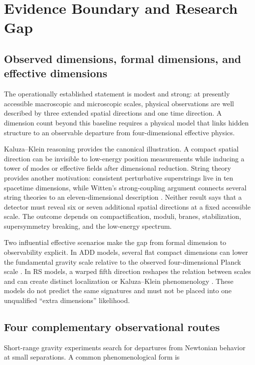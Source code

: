 \documentclass[conference]{IEEEtran}
\begin{document}
\section{Evidence Boundary and Research Gap}

\subsection{Observed dimensions, formal dimensions, and effective dimensions}

The operationally established statement is modest and strong: at presently accessible macroscopic and microscopic scales, physical observations are well described by three extended spatial directions and one time direction. A dimension count beyond this baseline requires a physical model that links hidden structure to an observable departure from four-dimensional effective physics.

Kaluza--Klein reasoning provides the canonical illustration. A compact spatial direction can be invisible to low-energy position measurements while inducing a tower of modes or effective fields after dimensional reduction. String theory provides another motivation: consistent perturbative superstrings live in ten spacetime dimensions, while Witten's strong-coupling argument connects several string theories to an eleven-dimensional description \cite{polchinski,witten}. Neither result says that a detector must reveal six or seven additional spatial directions at a fixed accessible scale. The outcome depends on compactification, moduli, branes, stabilization, supersymmetry breaking, and the low-energy spectrum.

Two influential effective scenarios make the gap from formal dimension to observability explicit. In ADD models, several flat compact dimensions can lower the fundamental gravity scale relative to the observed four-dimensional Planck scale \cite{add}. In RS models, a warped fifth direction reshapes the relation between scales and can create distinct localization or Kaluza--Klein phenomenology \cite{rs1,rs2}. These models do not predict the same signatures and must not be placed into one unqualified ``extra dimensions'' likelihood.

\subsection{Four complementary observational routes}

Short-range gravity experiments search for departures from Newtonian behavior at small separations. A common phenomenological form is
\end{document}
